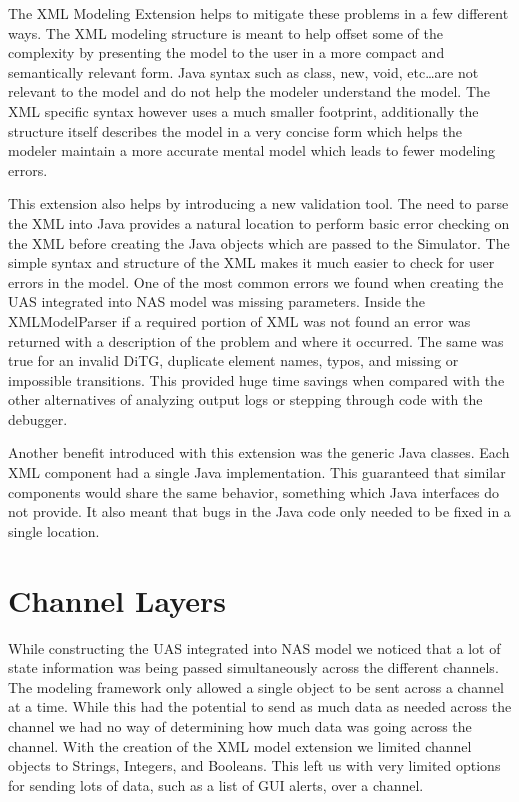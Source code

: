 The XML Modeling Extension helps to mitigate these problems in a few different ways.  The XML modeling structure is meant to help offset some of the complexity by presenting the model to the user in a more compact and semantically relevant form.  Java syntax such as class, new, void, etc\ldots are not relevant to the model and do not help the modeler understand the model.  The XML specific syntax however uses a much smaller footprint, additionally the structure itself describes the model in a very concise form which helps the modeler maintain a more accurate mental model which leads to fewer modeling errors.

This extension also helps by introducing a new validation tool.  The need to parse the XML into Java provides a natural location to perform basic error checking on the XML before creating the Java objects which are passed to the Simulator. The simple syntax and structure of the XML makes it much easier to check for user errors in the model.  One of the most common errors we found when creating the UAS integrated into NAS model was missing parameters.  Inside the XMLModelParser if a required portion of XML was not found an error was returned with a description of the problem and where it occurred.  The same was true for an invalid DiTG, duplicate element names, typos, and missing or impossible transitions.  This provided huge time savings when compared with the other alternatives of analyzing output logs or stepping through code with the debugger.

Another benefit introduced with this extension was the generic Java classes.  Each XML component had a single Java implementation.  This guaranteed that similar components would share the same behavior, something which Java interfaces do not provide.  It also meant that bugs in the Java code only needed to be fixed in a single location.

\section{Channel Layers}

While constructing the UAS integrated into NAS model we noticed that a lot of state information was being passed simultaneously across the different channels.  The modeling framework only allowed a single object to be sent across a channel at a time.  While this had the potential to send as much data as needed across the channel we had no way of determining how much data was going across the channel.  With the creation of the XML model extension we limited channel objects to Strings, Integers, and Booleans.  This left us with very limited options for sending lots of data, such as a list of GUI alerts, over a channel.  

